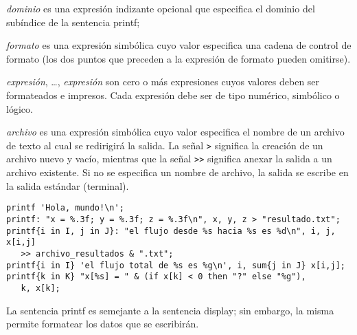 \documentclass[11pt,spanish]{report}
\def\para#1{\noindent{\bf#1}}
\begin{document}
\noindent
{}

\medskip

\noindent
{\it dominio} es una expresión indizante opcional que especifica el dominio del subíndice de la sentencia printf;

\noindent
{\it formato} es una expresión simbólica cuyo valor especifica una cadena de control de formato (los dos puntos que preceden a la expresión de formato pueden omitirse).

\noindent
{\it expresión}, \dots, {\it expresión} son cero o más expresiones cuyos valores deben ser formateados e impresos. Cada expresión debe ser de tipo numérico, simbólico o lógico.

\noindent
{\it archivo} es una expresión simbólica cuyo valor especifica el nombre de un archivo de texto al cual se redirigirá la salida. La señal {\tt>} significa la creación de un archivo nuevo y vacío, mientras que la señal {\tt>}{\tt>} significa anexar la salida a un archivo existente. Si no se especifica un nombre de archivo, la salida se escribe en la salida estándar (terminal).

\para{Ejemplos}

\begin{verbatim}
printf 'Hola, mundo!\n';
printf: "x = %.3f; y = %.3f; z = %.3f\n", x, y, z > "resultado.txt";
printf{i in I, j in J}: "el flujo desde %s hacia %s es %d\n", i, j, x[i,j]
   >> archivo_resultados & ".txt";
printf{i in I} 'el flujo total de %s es %g\n', i, sum{j in J} x[i,j];
printf{k in K} "x[%s] = " & (if x[k] < 0 then "?" else "%g"),
   k, x[k];
\end{verbatim}

La sentencia printf es semejante a la sentencia display; sin embargo, la misma permite formatear los datos que se escribirán.
\end{document}
